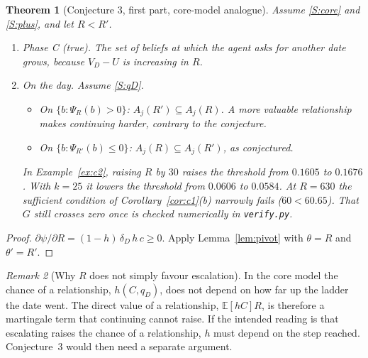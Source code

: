 \documentclass[11pt,a4paper]{article}
\newtheorem{theorem}{Theorem}
\theoremstyle{definition}
\theoremstyle{remark}
\newtheorem{remark}[theorem]{Remark}
\newcommand{\E}{\mathbb{E}}
\begin{document}
\begin{theorem}[Conjecture 3, first part, core-model analogue]\label{thm:c3}
Assume \ref{S:core} and \ref{S:plus}, and let $R<R'$.
\begin{enumerate}[label=(\alph*)]
\item \emph{Phase C (true).} The set of beliefs at which the agent asks for another date grows, because $V_D-U$ is increasing in $R$.
\item \emph{On the day.} Assume \ref{S:qD}.
\begin{itemize}[nosep]
\item On $\{b:\Psi_R(b)>0\}$: $A_j(R')\subseteq A_j(R)$. A more valuable relationship makes continuing \emph{harder}, contrary to the conjecture.
\item On $\{b:\Psi_{R'}(b)\le0\}$: $A_j(R)\subseteq A_j(R')$, as conjectured.
\end{itemize}
In Example~\ref{ex:c2}, raising $R$ by $30$ raises the threshold from $0.1605$ to $0.1676$. With $k=25$ it lowers the threshold from $0.0606$ to $0.0584$. At $R=630$ the sufficient condition of Corollary~\ref{cor:c1}(b) narrowly fails ($60<60.65$). That $G$ still crosses zero once is checked numerically in \texttt{verify.py}.
\end{enumerate}
\end{theorem}

\begin{proof}
$\partial\psi/\partial R=(1-h)\,\delta_D\,h\,c\ge0$. Apply Lemma~\ref{lem:pivot} with $\theta=R$ and $\theta'=R'$.
\end{proof}

\begin{remark}[Why $R$ does not simply favour escalation]
In the core model the chance of a relationship, $h(C,q_D)$, does not depend on how far up the ladder the date went. The direct value of a relationship, $\E[hC]R$, is therefore a martingale term that continuing cannot raise. If the intended reading is that escalating raises the chance of a relationship, $h$ must depend on the step reached. Conjecture~3 would then need a separate argument.
\end{remark}
\end{document}
